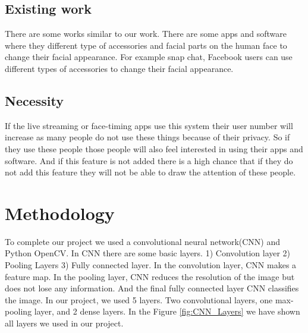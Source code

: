\documentclass[conference]{IEEEtran}
\begin{document}
\subsection{Existing work}
There are some works similar to our work. There are some apps and software where they different type of accessories and facial parts on the human face to change their facial appearance. For example snap chat, Facebook users can use different types of accessories to change their facial appearance.

\subsection{Necessity}
If the live streaming or face-timing apps use this system their user number will increase as many people do not use these things because of their privacy. So if they use these people those people will also feel interested in using their apps and software. And if this feature is not added there is a high chance that if they do not add this feature they will not be able to draw the attention of these people. 


\section{Methodology}
To complete our project we used a convolutional neural network(CNN) and Python OpenCV.  In CNN there are some basic layers. 1) Convolution layer 2) Pooling Layers 3) Fully connected layer. In the convolution layer, CNN makes a feature map. In the pooling layer, CNN reduces the resolution of the image but does not lose any information. And the final fully connected layer CNN classifies the image. In our project, we used 5 layers. Two convolutional layers, one max-pooling layer, and 2 dense layers. In the Figure \ref{fig:CNN_Layers} we have shown all layers we used in our project.
\end{document}
